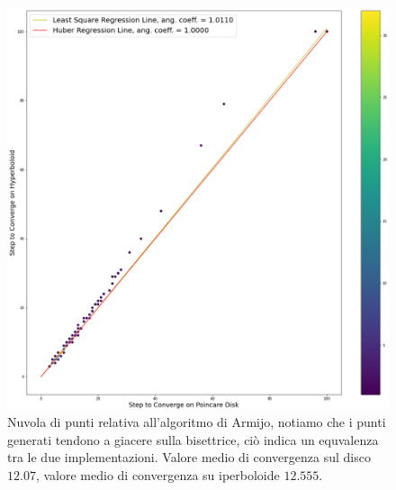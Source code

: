 \documentclass[a4paper, 12pt]{article}
\begin{document}
\begin{figure}[t] %
    \centering\includegraphics[width=1\textwidth]{armijo.png}
    \caption{Nuvola di punti relativa all'algoritmo di Armijo, notiamo che i punti generati tendono a giacere sulla bisettrice, ciò indica un equvalenza tra le due implementazioni. Valore medio di convergenza sul disco $12.07$, valore medio di convergenza su iperboloide $12.555$.}
\end{figure}
\end{document}
